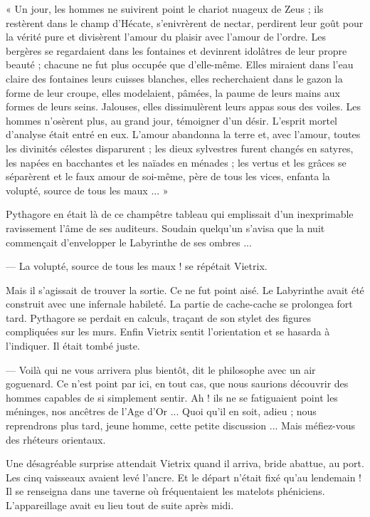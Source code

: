 \documentclass[a4paper, 11pt, oneside, polutonikogreek, french]{article}
\begin{document}
« Un jour, les hommes ne suivirent point le chariot nuageux de Zeus ; ils restèrent dans le champ d'Hécate, s'enivrèrent de nectar, perdirent leur goût pour la vérité pure et divisèrent l'amour du plaisir avec l'amour de l'ordre. Les bergères se regardaient dans les fontaines et devinrent idolâtres de leur propre beauté ; chacune ne fut plus occupée que d'elle-même. Elles miraient dans l'eau claire des fontaines leurs cuisses blanches, elles recherchaient dans le gazon la forme de leur croupe, elles modelaient, pâmées, la paume de leurs mains aux formes de leurs seins. Jalouses, elles dissimulèrent leurs appas sous des voiles. Les hommes n'osèrent plus, au grand jour, témoigner d'un désir. L'esprit mortel d'analyse était entré en eux. L'amour abandonna la terre et, avec l'amour, toutes les divinités célestes disparurent ; les dieux sylvestres furent changés en satyres, les napées en bacchantes et les naïades en ménades ; les vertus et les grâces se séparèrent et le faux amour de soi-même, père de tous les vices, enfanta la volupté, source de tous les maux ... »

\bigskip
\centerline{\EightStarTaper}
\centerline{\EightStarTaper\EightStarTaper}
\bigskip

Pythagore en était là de ce champêtre tableau qui emplissait d'un inexprimable ravissement l'âme de ses auditeurs. Soudain quelqu'un s'avisa que la nuit commençait d'envelopper le Labyrinthe de ses ombres ...

--- La volupté, source de tous les maux ! se répétait Vietrix.

Mais il s'agissait de trouver la sortie. Ce ne fut point aisé. Le Labyrinthe avait été construit avec une infernale habileté. La partie de cache-cache se prolongea fort tard. Pythagore se perdait en calculs, traçant de son stylet des figures compliquées sur les murs. Enfin Vietrix sentit l'orientation et se hasarda à l'indiquer. Il était tombé juste.

--- Voilà qui ne vous arrivera plus bientôt, dit le philosophe avec un air goguenard. Ce n'est point par ici, en tout cas, que nous saurions découvrir des hommes capables de si simplement sentir. Ah ! ils ne se fatiguaient point les méninges, nos ancêtres de l'Age d'Or ... Quoi qu'il en soit, adieu ; nous reprendrons plus tard, jeune homme, cette petite discussion ... Mais méfiez-vous des rhéteurs orientaux.

\bigskip
\centerline{\EightStarTaper}
\centerline{\EightStarTaper\EightStarTaper}
\bigskip

Une désagréable surprise attendait Vietrix quand il arriva, bride abattue, au port. Les cinq vaisseaux avaient levé l'ancre. Et le départ n'était fixé qu'au lendemain ! Il se renseigna dans une taverne où fréquentaient les matelots phéniciens. L'appareillage avait eu lieu tout de suite après midi.
\end{document}
